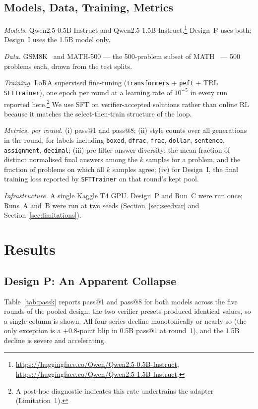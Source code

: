 \documentclass[runningheads]{llncs}
\begin{document}
\subsection{Models, Data, Training, Metrics}
\label{sec:config}

\emph{Models.} Qwen2.5-0.5B-Instruct and
Qwen2.5-1.5B-Instruct.\footnote{\url{https://huggingface.co/Qwen/Qwen2.5-0.5B-Instruct},
\url{https://huggingface.co/Qwen/Qwen2.5-1.5B-Instruct}.}
Design~P uses both; Design~I uses the 1.5B model only.

\emph{Data.} GSM8K~\cite{ref_gsm8k} and MATH-500 --- the 500-problem
subset of MATH~\cite{ref_math} --- 500 problems each, drawn from the test
splits.

\emph{Training.} LoRA supervised fine-tuning
(\texttt{transformers} + \texttt{peft} + TRL \texttt{SFTTrainer}), one
epoch per round at a learning rate of $10^{-5}$ in every run reported
here.\footnote{A post-hoc diagnostic indicates this rate undertrains the
adapter (Limitation~1).}
We use SFT on verifier-accepted solutions rather than
online RL because it matches the select-then-train structure of the loop.

\emph{Metrics, per round.}
(i) pass@1 and pass@8;
(ii) style counts over all generations in the round, for labels including
\texttt{boxed}, \texttt{dfrac}, \texttt{frac}, \texttt{dollar},
\texttt{sentence}, \texttt{assignment}, \texttt{decimal};
(iii) pre-filter answer diversity: the mean fraction of distinct normalised
final answers among the $k$ samples for a problem, and the fraction of
problems on which all $k$ samples agree;
(iv) for Design~I, the final training loss reported by
\texttt{SFTTrainer} on that round's kept pool.

\emph{Infrastructure.} A single Kaggle T4 GPU. Design~P and Run~C were run
once; Runs~A and~B were run at two seeds (Section~\ref{sec:seedvar} and
Section~\ref{sec:limitations}).

\section{Results}
\label{sec:results}

\subsection{Design P: An Apparent Collapse}
\label{sec:pooled}

Table~\ref{tab:passk} reports pass@1 and pass@8 for both models across the
five rounds of the pooled design; the two verifier presets produced
identical values, so a single column is shown. All four series decline
monotonically or nearly so (the only exception is a $+0.8$-point blip in
0.5B pass@1 at round~1), and the 1.5B decline is severe and accelerating.
\end{document}
